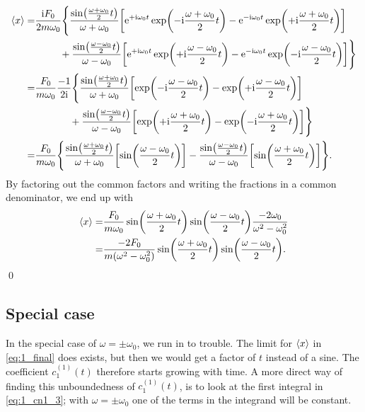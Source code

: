 \documentclass[11pt,letter, swedish, english
]{article}
\begin{document}
\begin{equation}
\begin{aligned}
\ev{x}=&\frac{\ii F_0}{2 m\omega_0}\Bigg\{
\frac{\sin(\frac{\omega+\omega_0}{2}t)}
{\omega+\omega_0}
\qty[
\ee^{+\ii\omega_0t}\exp(-\ii\frac{\omega+\omega_0}{2}t)-
\ee^{-\ii\omega_0t}\exp(+\ii\frac{\omega+\omega_0}{2}t)
] \\ & \hspace{25pt}
+\frac{\sin(\frac{\omega-\omega_0}{2}t)}
{\omega-\omega_0}
\qty[\ee^{+\ii\omega_0t}\exp(+\ii\frac{\omega-\omega_0}{2}t)
-\ee^{-\ii\omega_0t}\exp(-\ii\frac{\omega-\omega_0}{2}t)
]
\Bigg\}\\
=&\frac{F_0}{m\omega_0}\frac{-1}{2\ii}\Bigg\{
\frac{\sin(\frac{\omega+\omega_0}{2}t)}
{\omega+\omega_0}
\qty[
\exp(-\ii\frac{\omega-\omega_0}{2}t)-
\exp(+\ii\frac{\omega-\omega_0}{2}t)
] \\ & \hspace{35pt}
+\frac{\sin(\frac{\omega-\omega_0}{2}t)}
{\omega-\omega_0}
\qty[\exp(+\ii\frac{\omega+\omega_0}{2}t)
-\exp(-\ii\frac{\omega+\omega_0}{2}t)
]
\Bigg\}\\
=&\frac{F_0}{m\omega_0}
\Bigg\{
\frac{\sin(\frac{\omega+\omega_0}{2}t)}
{\omega+\omega_0}
\qty[ \sin(\frac{\omega-\omega_0}{2}t) ] 
-\frac{\sin(\frac{\omega-\omega_0}{2}t)}
{\omega-\omega_0}
\qty[\sin(\frac{\omega+\omega_0}{2}t)
] \Bigg\}.\\
\end{aligned}
\end{equation}
By factoring out the common factors and writing the fractions in a
common denominator, we end up with
\begin{equation}\label{eq:1_final}
\begin{aligned}
\ev{x}=&\frac{F_0}{m\omega_0}
\sin(\frac{\omega+\omega_0}{2}t)
\sin(\frac{\omega-\omega_0}{2}t)
\frac{-2\omega_0}{\omega^2-\omega_0^2}\\
=&\frac{-2F_0}{m\qty(\omega^2-\omega_0^2)}
\sin(\frac{\omega+\omega_0}{2}t)
\sin(\frac{\omega-\omega_0}{2}t).
\end{aligned}
\end{equation}
\qed

\subsection*{Special case}
In the special case of $\omega=\pm\omega_0$, we run in to trouble. The
limit for $\ev{x}$ in \eqref{eq:1_final} does exists, but then we
would get a factor of $t$ instead of a sine. The coefficient
$c^{(1)}_1(t)$ therefore starts growing with time. A more direct way
of finding this unboundedness of $c^{(1)}_1(t)$, is to look at the
first integral in \eqref{eq:1_cn1_3}; with $\omega=\pm\omega_0$ one of
the terms in the integrand will be constant. 
\end{document}
